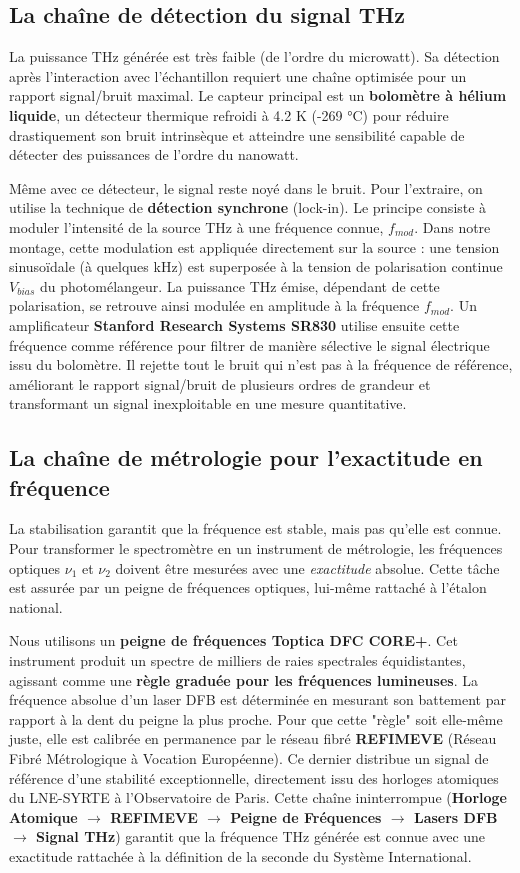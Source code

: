 \subsection{La chaîne de détection du signal THz}
La puissance THz générée est très faible (de l'ordre du microwatt). Sa détection après l'interaction avec l'échantillon requiert une chaîne optimisée pour un rapport signal/bruit maximal. Le capteur principal est un \textbf{bolomètre à hélium liquide}, un détecteur thermique refroidi à 4.2 K (-269 °C) pour réduire drastiquement son bruit intrinsèque et atteindre une sensibilité capable de détecter des puissances de l'ordre du nanowatt.

Même avec ce détecteur, le signal reste noyé dans le bruit. Pour l'extraire, on utilise la technique de \textbf{détection synchrone} (lock-in). Le principe consiste à moduler l'intensité de la source THz à une fréquence connue, $f_{mod}$. Dans notre montage, cette modulation est appliquée directement sur la source : une tension sinusoïdale (à quelques kHz) est superposée à la tension de polarisation continue $V_{bias}$ du photomélangeur. La puissance THz émise, dépendant de cette polarisation, se retrouve ainsi modulée en amplitude  à la fréquence $f_{mod}$. Un amplificateur \textbf{Stanford Research Systems SR830} utilise ensuite cette fréquence comme référence pour filtrer de manière sélective le signal électrique issu du bolomètre. Il rejette tout le bruit qui n'est pas à la fréquence de référence, améliorant le rapport signal/bruit de plusieurs ordres de grandeur et transformant un signal inexploitable en une mesure quantitative.


\subsection{La chaîne de métrologie pour l'exactitude en fréquence}
La stabilisation garantit que la fréquence est stable, mais pas qu'elle est connue. Pour transformer le spectromètre en un instrument de métrologie, les fréquences optiques $\nu_1$ et $\nu_2$ doivent être mesurées avec une \textit{exactitude} absolue. Cette tâche est assurée par un peigne de fréquences optiques, lui-même rattaché à l'étalon national.

Nous utilisons un \textbf{peigne de fréquences Toptica DFC CORE+}. Cet instrument produit un spectre de milliers de raies spectrales équidistantes, agissant comme une \textbf{règle graduée pour les fréquences lumineuses}. La fréquence absolue d'un laser DFB est déterminée en mesurant son battement par rapport à la dent du peigne la plus proche. Pour que cette "règle" soit elle-même juste, elle est calibrée en permanence par le réseau fibré \textbf{REFIMEVE} (Réseau Fibré Métrologique à Vocation Européenne). Ce dernier distribue un signal de référence d'une stabilité exceptionnelle, directement issu des horloges atomiques du LNE-SYRTE à l'Observatoire de Paris. Cette chaîne ininterrompue (\textbf{Horloge Atomique $\rightarrow$ REFIMEVE $\rightarrow$ Peigne de Fréquences $\rightarrow$ Lasers DFB $\rightarrow$ Signal THz}) garantit que la fréquence THz générée est connue avec une exactitude rattachée à la définition de la seconde du Système International.


